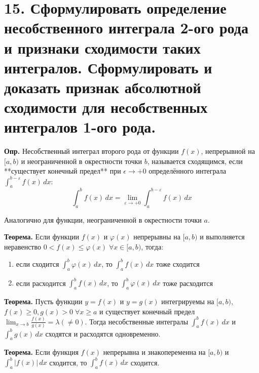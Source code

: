 \documentclass[11pt]{article}
\begin{document}
\section*{15. Сформулировать определение несобственного интеграла 2-ого рода и признаки сходимости таких интегралов. Сформулировать и доказать признак абсолютной сходимости для несобственных интегралов 1-ого рода.}
\par\textbf{Опр.} Несобственный интеграл второго рода от функции $f(x)$, непрерывной на $[a, b)$ и неограниченной в окрестности точки $b$, называется сходящимся, если **существует конечный предел** при $\epsilon \to +0$ определённого интеграла $\int_{a}^{b-\varepsilon} f(x) \, dx$:$$\int_{a}^{b} f(x) \, dx = \lim_{ \varepsilon \to +0}{\int_{a}^{b - \varepsilon} f(x) \, dx }$$
\par Аналогично для функции, неограниченной в окрестности точки $a$.
\par\textbf{Теорема.} Если функции $f(x)$ и $\varphi(x)$ непрерывны на $[a, b)$ и выполняется неравенство $0 < f(x) \leq \varphi(x) \; \forall x \in [a, b)$, тогда:
\begin{enumerate}
\item если сходится $\int_{a}^{b} \varphi(x) \, dx$, то $\int_{a}^{b} f(x) \, dx$ тоже сходится
\item если расходится $\int_{a}^{b} f(x) \, dx$, то $\int_{a}^{b} \varphi(x) \, dx$ тоже расходится
\end{enumerate}
\par\textbf{Теорема.} Пусть функции $y = f(x)$ и $y = g(x)$ интегрируемы на $[a, b)$, $f(x) \geq 0, g(x) > 0 \; \forall x \geq a$ и существует конечный предел $\lim_{ x \to b }{\frac{f(x)}{g(x)}} = \lambda (\not = 0)$. Тогда несобственные интегралы $\int_{a}^{b} f(x) \, dx$ и $\int_{a}^{b} g(x) \, dx$ сходятся и расходятся одновременно.
\par\textbf{Теорема.} Если функция $f(x)$ непрерывна и знакопеременна на $[a, b)$ и $\int_{a}^{b} |f(x)| \, dx$ сходится, то $\int_{a}^{b} f(x) \, dx$ сходится.
\end{document}
